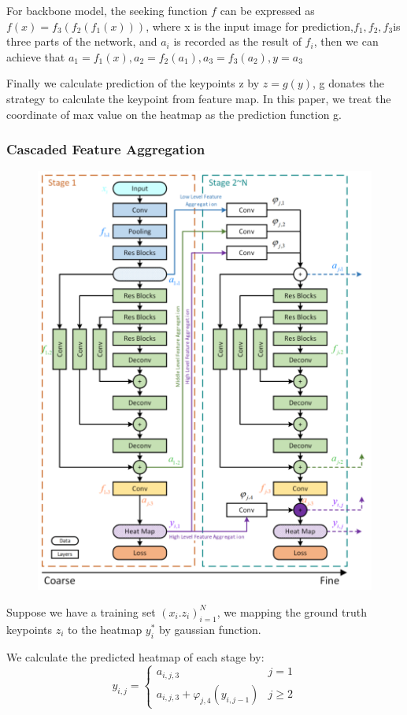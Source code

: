 \documentclass[11pt]{article}
\begin{document}
For backbone model, the seeking function $f$ can be expressed as$f(x)=f_3(f_2(f_1(x)))$, where x
is the input image for prediction,$f_1,f_2,f_3$is three parts of the network, and $a_i$ is recorded as 
the result of $f_i$, then we can achieve that $a_1 = f_1(x),a_2 = f_2(a_1), a_3 = f_3(a_2),y=a_3$

Finally we calculate prediction of the keypoints z by $z = g(y)$, g donates the strategy to calculate the keypoint from feature map. In this paper, we treat the coordinate of max value on the heatmap as the prediction function g.
\subsubsection{Cascaded Feature Aggregation}
\begin{figure}[h]
	\centering
	\includegraphics[scale = 0.8]{51}
\end{figure}
Suppose we have a training set ${(x_i.z_i)}^N_{i=1}$, we mapping the ground truth keypoints $z_i$ to the heatmap $y_i^*$ by gaussian function.

We calculate the predicted heatmap of each stage by:
$$y_{i,j}=\left\{\begin{matrix}
	a_{i,j,3} &j=1\\ 
	a_{i,j,3}+\varphi_{j,4}(y_{i,j-1})  &j\geq 2
\end{matrix}\right.$$
\end{document}
